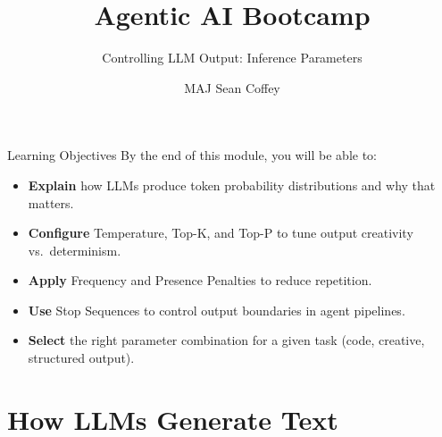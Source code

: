 \documentclass{beamer}
\title[]{Agentic AI Bootcamp}
\subtitle[]{Controlling LLM Output: Inference Parameters}
\author[]{MAJ Sean Coffey}
\institute{Army Cyber Institute, U.S. Military Academy}
\date{\monthyeardate}
\begin{document}
{\DivisionLogo
\begin{frame}
    \titlepage
\end{frame}
}

\begin{frame}{Learning Objectives}
    By the end of this module, you will be able to:
    \begin{itemize}
        \item \textbf{Explain} how LLMs produce token probability distributions and why that matters.
        \item \textbf{Configure} Temperature, Top-K, and Top-P to tune output creativity vs.\ determinism.
        \item \textbf{Apply} Frequency and Presence Penalties to reduce repetition.
        \item \textbf{Use} Stop Sequences to control output boundaries in agent pipelines.
        \item \textbf{Select} the right parameter combination for a given task (code, creative, structured output).
    \end{itemize}
\end{frame}

\section{How LLMs Generate Text}
\end{document}
